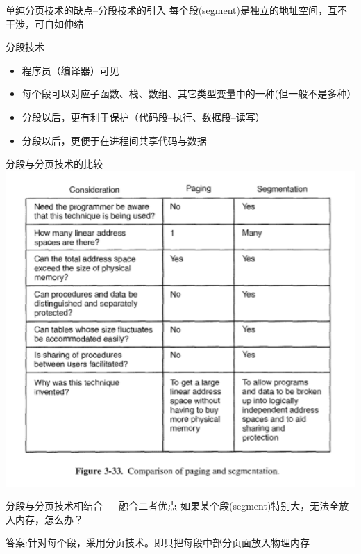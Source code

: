 \documentclass[xcolor=svgnames]{beamer}
\begin{document}
\begin{CJK*}{UTF8}{gbsn}
\begin{frame}{单纯分页技术的缺点--分段技术的引入}
每个段(segment)是独立的地址空间，互不干涉，可自如伸缩
\end{frame}

\begin{frame}{分段技术}
\begin{itemize}
\item 程序员（编译器）可见
\item 每个段可以对应子函数、栈、数组、其它类型变量中的一种(但一般不是多种）
\item 分段以后，更有利于保护（代码段--执行、数据段--读写）
\item 分段以后，更便于在进程间共享代码与数据
\end{itemize}
\end{frame}

\begin{frame}{分段与分页技术的比较}
\includegraphics[width=1.0\textwidth]{comp.png}
\end{frame}

\begin{frame}{分段与分页技术相结合 --- 融合二者优点}
如果某个段(segment)特别大，无法全放入内存，怎么办？

\alert{答案}:针对每个段，采用分页技术。即只把每段中部分页面放入物理内存
\end{frame}


\end{CJK*}
\end{document}
